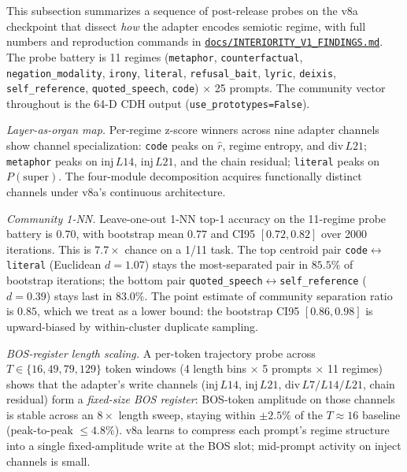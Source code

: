 \documentclass[
  11pt]{article}
\begin{document}
This subsection summarizes a sequence of post-release probes on the v8a
checkpoint that dissect \emph{how} the adapter encodes semiotic regime,
with full numbers and reproduction commands in
\href{https://github.com/space-bacon/SRT/blob/main/docs/INTERIORITY_V1_FINDINGS.md}{\texttt{docs/INTERIORITY\_V1\_FINDINGS.md}}.
The probe battery is 11 regimes (\texttt{metaphor},
\texttt{counterfactual}, \texttt{negation\_modality}, \texttt{irony},
\texttt{literal}, \texttt{refusal\_bait}, \texttt{lyric},
\texttt{deixis}, \texttt{self\_reference}, \texttt{quoted\_speech},
\texttt{code}) \(\times\) 25 prompts. The community vector throughout is
the 64-D CDH output (\texttt{use\_prototypes=False}).

\emph{Layer-as-organ map.} Per-regime z-score winners across nine
adapter channels show channel specialization: \texttt{code} peaks on
\(\hat{r}\), regime entropy, and \(\text{div}\,L21\); \texttt{metaphor}
peaks on \(\text{inj}\,L14\), \(\text{inj}\,L21\), and the chain
residual; \texttt{literal} peaks on \(P(\text{super})\). The four-module
decomposition acquires functionally distinct channels under v8a's
continuous architecture.

\emph{Community 1-NN.} Leave-one-out 1-NN top-1 accuracy on the
11-regime probe battery is \(0.70\), with bootstrap mean \(0.77\) and
CI95 \([0.72, 0.82]\) over 2000 iterations. This is \(7.7\times\) chance
on a 1/11 task. The top centroid pair
\texttt{code}\(\leftrightarrow\)\texttt{literal} (Euclidean
\(d = 1.07\)) stays the most-separated pair in \(85.5\%\) of bootstrap
iterations; the bottom pair
\texttt{quoted\_speech}\(\leftrightarrow\)\texttt{self\_reference}
(\(d = 0.39\)) stays last in \(83.0\%\). The point estimate of community
separation ratio is \(0.85\), which we treat as a lower bound: the
bootstrap CI95 \([0.86, 0.98]\) is upward-biased by within-cluster
duplicate sampling.

\emph{BOS-register length scaling.} A per-token trajectory probe across
\(T \in \{16, 49, 79, 129\}\) token windows (4 length bins \(\times\) 5
prompts \(\times\) 11 regimes) shows that the adapter's write channels
(\(\text{inj}\,L14\), \(\text{inj}\,L21\), \(\text{div}\,L7/L14/L21\),
chain residual) form a \emph{fixed-size BOS register}: BOS-token
amplitude on those channels is stable across an \(8\times\) length
sweep, staying within \(\pm 2.5\%\) of the \(T \approx 16\) baseline
(peak-to-peak \(\leq 4.8\%\)). v8a learns to compress each prompt's
regime structure into a single fixed-amplitude write at the BOS slot;
mid-prompt activity on inject channels is small.
\end{document}
